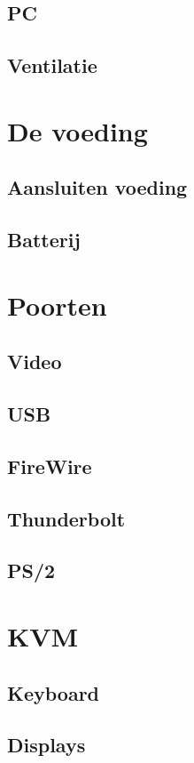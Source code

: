 \documentclass[a4paper,12pt,twoside,openright,titlepage]{book}
\begin{document}
\section{PC}

\section{Ventilatie}

\chapter{De voeding}

\section{Aansluiten voeding}
\section{Batterij}

\chapter{Poorten}
\section{Video}
\section{USB}
\section{FireWire}
\section{Thunderbolt}
\section{PS/2}

\chapter{KVM}
\section{Keyboard}
\section{Displays}
\end{document}

